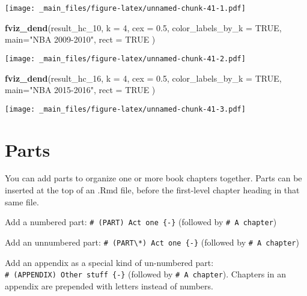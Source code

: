 \documentclass[
]{book}
\newenvironment{Shaded}{\begin{snugshade}}{\end{snugshade}}
\newcommand{\AttributeTok}[1]{\textcolor[rgb]{0.13,0.29,0.53}{#1}}
\newcommand{\ConstantTok}[1]{\textcolor[rgb]{0.56,0.35,0.01}{#1}}
\newcommand{\DecValTok}[1]{\textcolor[rgb]{0.00,0.00,0.81}{#1}}
\newcommand{\FloatTok}[1]{\textcolor[rgb]{0.00,0.00,0.81}{#1}}
\newcommand{\FunctionTok}[1]{\textcolor[rgb]{0.13,0.29,0.53}{\textbf{#1}}}
\newcommand{\NormalTok}[1]{#1}
\newcommand{\StringTok}[1]{\textcolor[rgb]{0.31,0.60,0.02}{#1}}
\theoremstyle{definition}
\theoremstyle{definition}
\theoremstyle{definition}
\theoremstyle{definition}
\theoremstyle{remark}
\begin{document}
\texttt{[image: \_main\_files/figure-latex/unnamed-chunk-41-1.pdf]}

\begin{Shaded}
\begin{Highlighting}[]
\FunctionTok{fviz\_dend}\NormalTok{(result\_hc\_10, }\AttributeTok{k =} \DecValTok{4}\NormalTok{,}
          \AttributeTok{cex =} \FloatTok{0.5}\NormalTok{,}
          \AttributeTok{color\_labels\_by\_k =} \ConstantTok{TRUE}\NormalTok{,}
          \AttributeTok{main=}\StringTok{"NBA 2009{-}2010"}\NormalTok{,}
          \AttributeTok{rect =} \ConstantTok{TRUE}
\NormalTok{)}
\end{Highlighting}
\end{Shaded}

\texttt{[image: \_main\_files/figure-latex/unnamed-chunk-41-2.pdf]}

\begin{Shaded}
\begin{Highlighting}[]
\FunctionTok{fviz\_dend}\NormalTok{(result\_hc\_16, }\AttributeTok{k =} \DecValTok{4}\NormalTok{,}
          \AttributeTok{cex =} \FloatTok{0.5}\NormalTok{,}
          \AttributeTok{color\_labels\_by\_k =} \ConstantTok{TRUE}\NormalTok{,}
          \AttributeTok{main=}\StringTok{"NBA 2015{-}2016"}\NormalTok{,}
          \AttributeTok{rect =} \ConstantTok{TRUE}
\NormalTok{)}
\end{Highlighting}
\end{Shaded}

\texttt{[image: \_main\_files/figure-latex/unnamed-chunk-41-3.pdf]}

\hypertarget{parts}{%
\chapter{Parts}\label{parts}}

You can add parts to organize one or more book chapters together. Parts can be inserted at the top of an .Rmd file, before the first-level chapter heading in that same file.

Add a numbered part: \texttt{\#\ (PART)\ Act\ one\ \{-\}} (followed by \texttt{\#\ A\ chapter})

Add an unnumbered part: \texttt{\#\ (PART\textbackslash{}*)\ Act\ one\ \{-\}} (followed by \texttt{\#\ A\ chapter})

Add an appendix as a special kind of un-numbered part: \texttt{\#\ (APPENDIX)\ Other\ stuff\ \{-\}} (followed by \texttt{\#\ A\ chapter}). Chapters in an appendix are prepended with letters instead of numbers.
\end{document}
